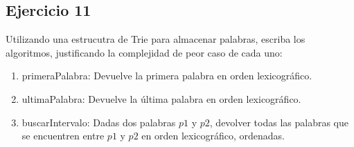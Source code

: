 \subsection{Ejercicio 11}
Utilizando una estrucutra de Trie para almacenar palabras, escriba los algoritmos, justificando la complejidad de peor caso de cada uno:
\begin{enumerate}
	\item primeraPalabra: Devuelve la primera palabra en orden lexicográfico.
	\item ultimaPalabra: Devuelve la última palabra en orden lexicográfico.
	\item buscarIntervalo: Dadas dos palabras $p1$ y $p2$, devolver todas las palabras que se encuentren entre $p1$ y $p2$ en orden lexicográfico, ordenadas.
\end{enumerate}
\hacer



